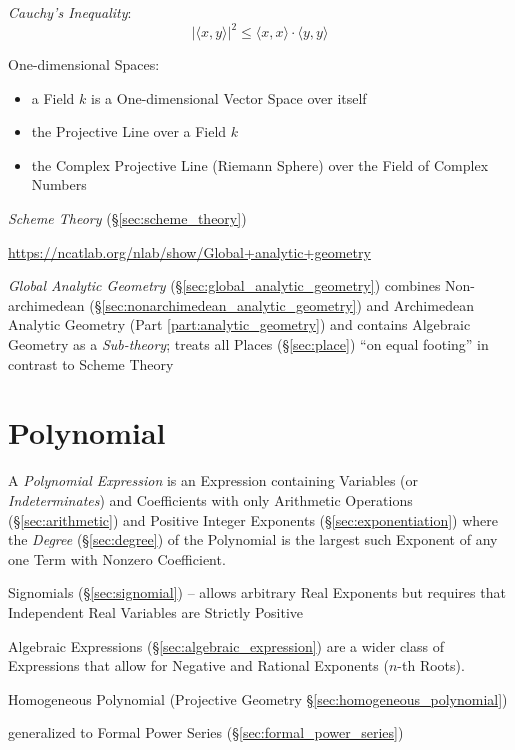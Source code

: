 \emph{Cauchy's Inequality}:
\[
    |\langle x,y \rangle|^2 \leq \langle x,x \rangle \cdot \langle
    y,y \rangle
\]

One-dimensional Spaces:
\begin{itemize}
\item a Field $k$ is a One-dimensional Vector Space over itself
\item the Projective Line over a Field $k$
\item the Complex Projective Line (Riemann Sphere) over the Field of Complex
  Numbers
\end{itemize}

\emph{Scheme Theory} (\S\ref{sec:scheme_theory})

\url{https://ncatlab.org/nlab/show/Global+analytic+geometry}

\emph{Global Analytic Geometry} (\S\ref{sec:global_analytic_geometry}) combines
Non-archimedean (\S\ref{sec:nonarchimedean_analytic_geometry}) and Archimedean
Analytic Geometry (Part \ref{part:analytic_geometry}) and contains Algebraic
Geometry as a \emph{Sub-theory}; treats all Places (\S\ref{sec:place}) ``on
equal footing'' in contrast to Scheme Theory



\section{Polynomial}\label{sec:polynomial}

A \emph{Polynomial Expression} is an Expression containing Variables (or
\emph{Indeterminates}) and Coefficients with only Arithmetic Operations
(\S\ref{sec:arithmetic}) and Positive Integer Exponents
(\S\ref{sec:exponentiation}) where the \emph{Degree} (\S\ref{sec:degree}) of
the Polynomial is the largest such Exponent of any one Term with Nonzero
Coefficient.

\fist Signomials (\S\ref{sec:signomial}) -- allows arbitrary Real Exponents but
requires that Independent Real Variables are Strictly Positive

\fist Algebraic Expressions (\S\ref{sec:algebraic_expression}) are a wider
class of Expressions that allow for Negative and Rational Exponents ($n$-th
Roots).

\fist Homogeneous Polynomial (Projective Geometry
\S\ref{sec:homogeneous_polynomial})

\fist generalized to Formal Power Series (\S\ref{sec:formal_power_series})


